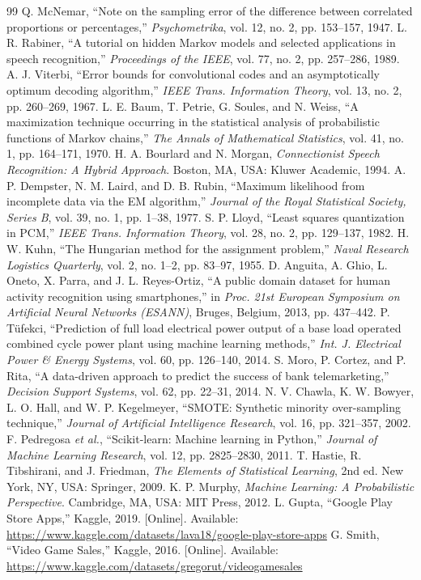 \begin{singlespace}
\begin{thebibliography}{99}
 Q. McNemar, ``Note on the sampling error of the difference between correlated proportions or percentages,'' \emph{Psychometrika}, vol. 12, no. 2, pp. 153–157, 1947.
 L. R. Rabiner, ``A tutorial on hidden Markov models and selected applications in speech recognition,'' \emph{Proceedings of the IEEE}, vol. 77, no. 2, pp. 257–286, 1989.
 A. J. Viterbi, ``Error bounds for convolutional codes and an asymptotically optimum decoding algorithm,'' \emph{IEEE Trans. Information Theory}, vol. 13, no. 2, pp. 260–269, 1967.
 L. E. Baum, T. Petrie, G. Soules, and N. Weiss, ``A maximization technique occurring in the statistical analysis of probabilistic functions of Markov chains,'' \emph{The Annals of Mathematical Statistics}, vol. 41, no. 1, pp. 164–171, 1970.
 H. A. Bourlard and N. Morgan, \emph{Connectionist Speech Recognition: A Hybrid Approach}. Boston, MA, USA: Kluwer Academic, 1994.
 A. P. Dempster, N. M. Laird, and D. B. Rubin, ``Maximum likelihood from incomplete data via the EM algorithm,'' \emph{Journal of the Royal Statistical Society, Series B}, vol. 39, no. 1, pp. 1–38, 1977.
 S. P. Lloyd, ``Least squares quantization in PCM,'' \emph{IEEE Trans. Information Theory}, vol. 28, no. 2, pp. 129–137, 1982.
 H. W. Kuhn, ``The Hungarian method for the assignment problem,'' \emph{Naval Research Logistics Quarterly}, vol. 2, no. 1–2, pp. 83–97, 1955.
 D. Anguita, A. Ghio, L. Oneto, X. Parra, and J. L. Reyes-Ortiz, ``A public domain dataset for human activity recognition using smartphones,'' in \emph{Proc. 21st European Symposium on Artificial Neural Networks (ESANN)}, Bruges, Belgium, 2013, pp. 437–442.
 P. Tüfekci, ``Prediction of full load electrical power output of a base load operated combined cycle power plant using machine learning methods,'' \emph{Int. J. Electrical Power \& Energy Systems}, vol. 60, pp. 126–140, 2014.
 S. Moro, P. Cortez, and P. Rita, ``A data-driven approach to predict the success of bank telemarketing,'' \emph{Decision Support Systems}, vol. 62, pp. 22–31, 2014.
 N. V. Chawla, K. W. Bowyer, L. O. Hall, and W. P. Kegelmeyer, ``SMOTE: Synthetic minority over-sampling technique,'' \emph{Journal of Artificial Intelligence Research}, vol. 16, pp. 321–357, 2002.
 F. Pedregosa \emph{et al.}, ``Scikit-learn: Machine learning in Python,'' \emph{Journal of Machine Learning Research}, vol. 12, pp. 2825–2830, 2011.
 T. Hastie, R. Tibshirani, and J. Friedman, \emph{The Elements of Statistical Learning}, 2nd ed. New York, NY, USA: Springer, 2009.
 K. P. Murphy, \emph{Machine Learning: A Probabilistic Perspective}. Cambridge, MA, USA: MIT Press, 2012.
 L. Gupta, ``Google Play Store Apps,'' Kaggle, 2019. [Online]. Available: \url{https://www.kaggle.com/datasets/lava18/google-play-store-apps}
 G. Smith, ``Video Game Sales,'' Kaggle, 2016. [Online]. Available: \url{https://www.kaggle.com/datasets/gregorut/videogamesales}
\end{thebibliography}
\end{singlespace}
